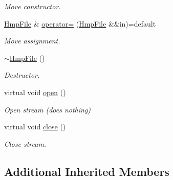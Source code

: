 \begin{DoxyCompactItemize}
\begin{DoxyCompactList}\small\item\em Move constructor. \end{DoxyCompactList}\item 
\mbox{\label{classsamp_files_1_1_hmp_file_a24bc4890a428b7e6d7530795dd3b4480}} 
\hyperlink{classsamp_files_1_1_hmp_file}{Hmp\+File} \& \hyperlink{classsamp_files_1_1_hmp_file_a24bc4890a428b7e6d7530795dd3b4480}{operator=} (\hyperlink{classsamp_files_1_1_hmp_file}{Hmp\+File} \&\&in)=default
\begin{DoxyCompactList}\small\item\em Move assignment. \end{DoxyCompactList}\item 
\mbox{\label{classsamp_files_1_1_hmp_file_a44354598fd14540e5b2775262e828318}} 
\hyperlink{classsamp_files_1_1_hmp_file_a44354598fd14540e5b2775262e828318}{$\sim$\+Hmp\+File} ()
\begin{DoxyCompactList}\small\item\em Destructor. \end{DoxyCompactList}\item 
\mbox{\label{classsamp_files_1_1_hmp_file_a9bd150295e4b261af45b78c19547a593}} 
virtual void \hyperlink{classsamp_files_1_1_hmp_file_a9bd150295e4b261af45b78c19547a593}{open} ()
\begin{DoxyCompactList}\small\item\em Open stream (does nothing) \end{DoxyCompactList}\item 
\mbox{\label{classsamp_files_1_1_hmp_file_a72b0f031c2260be66397752be52c929f}} 
virtual void \hyperlink{classsamp_files_1_1_hmp_file_a72b0f031c2260be66397752be52c929f}{close} ()
\begin{DoxyCompactList}\small\item\em Close stream. \end{DoxyCompactList}\end{DoxyCompactItemize}
\subsection*{Additional Inherited Members}


